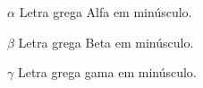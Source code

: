 

\begin{simbolos}
  \item[$\alpha$] Letra grega Alfa em minúsculo.
  \item[$\beta$]  Letra grega Beta em minúsculo.
  \item[$\gamma$] Letra grega gama em minúsculo.
\end{simbolos}


